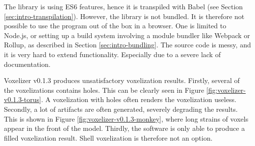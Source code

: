 The library is using ES6 features, hence it is transpiled with Babel (see Section \ref{sec:intro-transpilation}). However, the library is not bundled. It is therefore not possible to use the program out of the box in a browser. One is limited to Node.js, or setting up a build system involving a module bundler like Webpack or Rollup, as described in Section \ref{sec:intro-bundling}. The source code is messy, and it is very hard to extend functionality. Especially due to a severe lack of documentation.

Voxelizer v0.1.3 produces unsatisfactory voxelization results. Firstly, several of the voxelizations contains holes. This can be clearly seen in Figure \ref{fig:voxelizer-v0.1.3-torus}. A voxelization with holes often renders the voxelization useless. Secondly, a lot of artifacts are often generated, severely degrading the results. This is shown in Figure \ref{fig:voxelizer-v0.1.3-monkey}, where long strains of voxels appear in the front of the model. Thirdly, the software is only able to produce a filled voxelization result. Shell voxelization is therefore not an option.

